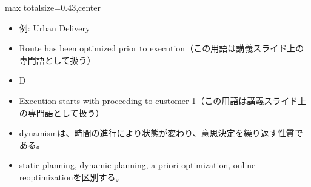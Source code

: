 \clearpage
{}
\begin{minipage}[t]{0.405\textwidth}
\begin{adjustbox}{max totalsize={\textwidth}{0.43\textheight},center}
\begin{minipage}{\textwidth}\scriptsize
{}\begin{itemize}
\item 例: Urban Delivery
\item Route has been optimized prior to execution（この用語は講義スライド上の専門語として扱う）
\item D
\item Execution starts with proceeding to customer 1（この用語は講義スライド上の専門語として扱う）
\end{itemize}\begin{itemize}
\item dynamismは、時間の進行により状態が変わり、意思決定を繰り返す性質である。
\item static planning, dynamic planning, a priori optimization, online reoptimizationを区別する。
\end{itemize}
\end{minipage}
\end{adjustbox}
\end{minipage}\hfill
